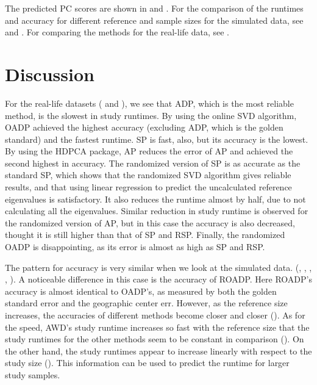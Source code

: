 \documentclass{article}
\begin{document}
The predicted PC scores are shown in  and .
For the comparison of the runtimes and accuracy for different reference and sample sizes for the simulated data,
see  and .
For comparing the methods for the real-life data, see .


\section{Discussion}

For the real-life datasets ( and ),
we see that ADP, which is the most reliable method,
is the slowest in study runtimes.
By using the online SVD algorithm,
OADP achieved the highest accuracy (excluding ADP, which is the golden standard) and the fastest runtime.
SP is fast, also,
but its accuracy is the lowest.
By using the HDPCA package,
AP reduces the error of AP
and achieved the second highest in accuracy.
The randomized version of SP is as accurate as the standard SP,
which shows that the randomized SVD algorithm gives reliable results,
and that using linear regression to predict the uncalculated reference eigenvalues is satisfactory.
It also reduces the runtime almost by half,
due to not calculating all the eigenvalues.
Similar reduction in study runtime is observed for the randomized version of AP,
but in this case the accuracy is also decreased,
thought it is still higher than that of SP and RSP.
Finally, the randomized OADP is disappointing,
as its error is almost as high as SP and RSP.

The pattern for accuracy is very similar when we look at the simulated data.
(, ,
, ,
).
A noticeable difference in this case is the accuracy of ROADP.
Here ROADP's accuracy is almost identical to OADP's,
as measured by both the golden standard error and the geographic center err.
However, as the reference size increases,
the accuracies of different methods become closer and closer ().
As for the speed,
AWD's study runtime increases so fast with the reference size
that the study runtimes for the other methods seem to be constant in comparison ().
On the other hand,
the study runtimes appear to increase linearly with respect to the study size ().
This information can be used to predict the runtime for larger study samples.
\end{document}

